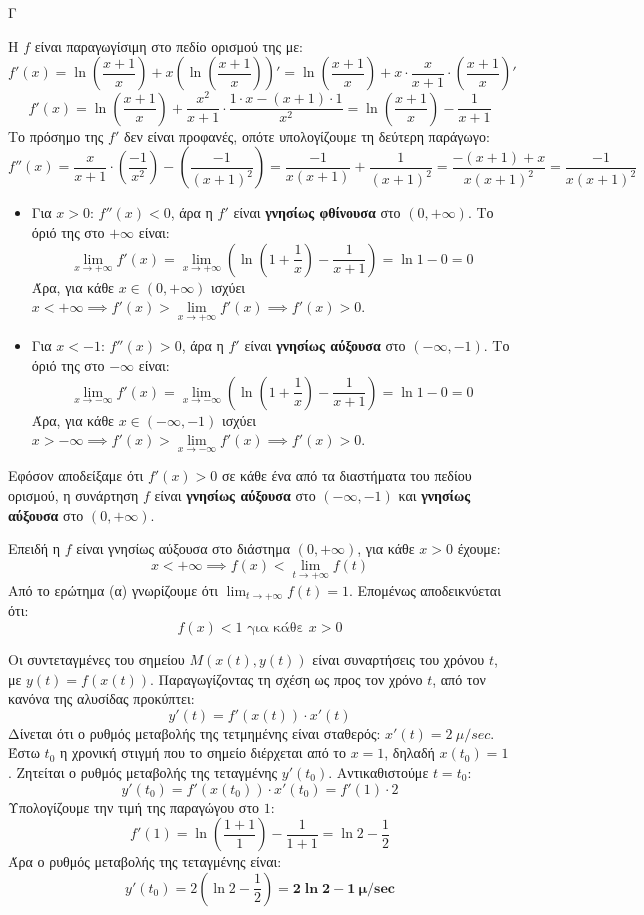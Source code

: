 \begin{thema}{Γ}
\begin{erwthma}
\item Η $f$ είναι παραγωγίσιμη στο πεδίο ορισμού της με:
\[ f'(x) = \ln\left(\frac{x+1}{x}\right) + x \left( \ln\left(\frac{x+1}{x}\right) \right)' = \ln\left(\frac{x+1}{x}\right) + x \cdot \frac{x}{x+1} \cdot \left( \frac{x+1}{x} \right)' \]
\[ f'(x) = \ln\left(\frac{x+1}{x}\right) + \frac{x^2}{x+1} \cdot \frac{1 \cdot x - (x+1) \cdot 1}{x^2} = \ln\left(\frac{x+1}{x}\right) - \frac{1}{x+1} \]
Το πρόσημο της $f'$ δεν είναι προφανές, οπότε υπολογίζουμε τη δεύτερη παράγωγο:
\[ f''(x) = \frac{x}{x+1} \cdot \left( \frac{-1}{x^2} \right) - \left( \frac{-1}{(x+1)^2} \right) = \frac{-1}{x(x+1)} + \frac{1}{(x+1)^2} = \frac{-(x+1) + x}{x(x+1)^2} = \frac{-1}{x(x+1)^2} \]
\begin{itemize}
    \item Για $x > 0$: $f''(x) < 0$, άρα η $f'$ είναι \textbf{γνησίως φθίνουσα} στο $(0, +\infty)$.
    Το όριό της στο $+\infty$ είναι:
    \[ \lim_{x \to +\infty} f'(x) = \lim_{x \to +\infty} \left( \ln\left(1+\frac{1}{x}\right) - \frac{1}{x+1} \right) = \ln 1 - 0 = 0 \]
    Άρα, για κάθε $x \in (0, +\infty)$ ισχύει $x < +\infty \implies f'(x) > \lim\limits_{x \to +\infty} f'(x) \implies f'(x) > 0$.
    \item Για $x < -1$: $f''(x) > 0$, άρα η $f'$ είναι \textbf{γνησίως αύξουσα} στο $(-\infty, -1)$.
    Το όριό της στο $-\infty$ είναι:
    \[ \lim_{x \to -\infty} f'(x) = \lim_{x \to -\infty} \left( \ln\left(1+\frac{1}{x}\right) - \frac{1}{x+1} \right) = \ln 1 - 0 = 0 \]
    Άρα, για κάθε $x \in (-\infty, -1)$ ισχύει $x > -\infty \implies f'(x) > \lim\limits_{x \to -\infty} f'(x) \implies f'(x) > 0$.
\end{itemize}
Εφόσον αποδείξαμε ότι $f'(x) > 0$ σε κάθε ένα από τα διαστήματα του πεδίου ορισμού, η συνάρτηση $f$ είναι \textbf{γνησίως αύξουσα} στο $(-\infty, -1)$ και \textbf{γνησίως αύξουσα} στο $(0, +\infty)$.

Επειδή η $f$ είναι γνησίως αύξουσα στο διάστημα $(0, +\infty)$, για κάθε $x > 0$ έχουμε:
\[ x < +\infty \implies f(x) < \lim_{t \to +\infty} f(t) \]
Από το ερώτημα (α) γνωρίζουμε ότι $\lim_{t \to +\infty} f(t) = 1$. Επομένως αποδεικνύεται ότι:
\[ f(x) < 1 \text{ για κάθε } x > 0 \]

\item Οι συντεταγμένες του σημείου $M(x(t), y(t))$ είναι συναρτήσεις του χρόνου $t$, με $y(t) = f(x(t))$.
Παραγωγίζοντας τη σχέση ως προς τον χρόνο $t$, από τον κανόνα της αλυσίδας προκύπτει:
\[ y'(t) = f'(x(t)) \cdot x'(t) \]
Δίνεται ότι ο ρυθμός μεταβολής της τετμημένης είναι σταθερός: $x'(t) = 2 \ \mu/\si{sec}$.
Έστω $t_0$ η χρονική στιγμή που το σημείο διέρχεται από το $x=1$, δηλαδή $x(t_0) = 1$.
Ζητείται ο ρυθμός μεταβολής της τεταγμένης $y'(t_0)$.
Αντικαθιστούμε $t = t_0$:
\[ y'(t_0) = f'(x(t_0)) \cdot x'(t_0) = f'(1) \cdot 2 \]
Υπολογίζουμε την τιμή της παραγώγου στο $1$:
\[ f'(1) = \ln\left(\frac{1+1}{1}\right) - \frac{1}{1+1} = \ln 2 - \frac{1}{2} \]
Άρα ο ρυθμός μεταβολής της τεταγμένης είναι:
\[ y'(t_0) = 2 \left( \ln 2 - \frac{1}{2} \right) = \boldsymbol{2 \ln 2 - 1 \ \mu/\si{sec}} \]
\end{erwthma}
\end{thema}

